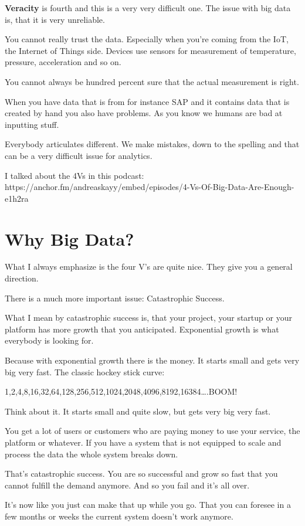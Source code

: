 \documentclass[12pt, numbers=noenddot]{scrreprt} %
\begin{document}
\textbf{Veracity} is fourth and this is a very very difficult one. The issue with big data is, that it is very unreliable.

You cannot really trust the data. Especially when you’re coming from the IoT, the Internet of Things side. Devices use sensors for measurement of temperature, pressure, acceleration and so on.

You cannot always be hundred percent sure that the actual measurement is right.

When you have data that is from for instance SAP and it contains data that is created by hand you also have problems. As you know we humans are bad at inputting stuff.

Everybody articulates different. We make mistakes, down to the spelling and that can be a very difficult issue for analytics.


I talked about the 4Vs in this podcast: https://anchor.fm/andreaskayy/embed/episodes/4-Vs-Of-Big-Data-Are-Enough-e1h2ra

\section{Why Big Data?}

What I always emphasize is the four V’s are quite nice. They give you a general direction.

There is a much more important issue: Catastrophic Success.

What I mean by catastrophic success is, that your project, your startup or your platform has more growth that you anticipated. Exponential growth is what everybody is looking for.

Because with exponential growth there is the money. It starts small and gets very big very fast. The classic hockey stick curve:

1,2,4,8,16,32,64,128,256,512,1024,2048,4096,8192,16384….BOOM!

Think about it. It starts small and quite slow, but gets very big very fast.

You get a lot of users or customers who are paying money to use your service, the platform or whatever. If you have a system that is not equipped to scale and process the data the whole system breaks down.

That’s catastrophic success. You are so successful and grow so fast that you cannot fulfill the demand anymore. And so you fail and it’s all over.

It’s now like you just can make that up while you go. That you can foresee in a few months or weeks the current system doesn’t work anymore.
\end{document}
